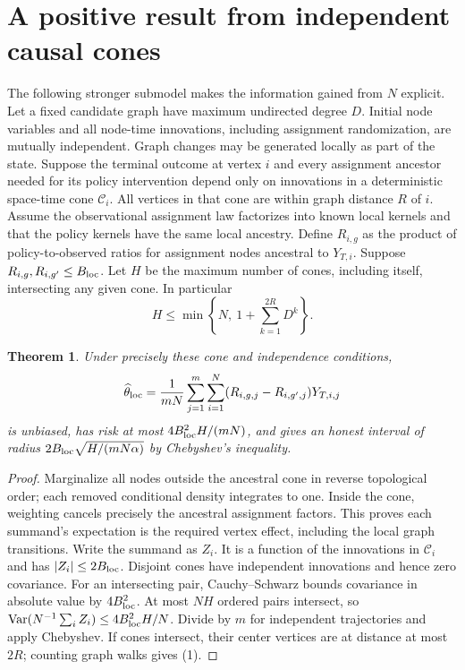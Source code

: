 \documentclass[11pt]{article}
\newtheorem{theorem}{Theorem}
\theoremstyle{definition}
\begin{document}
\section*{A positive result from independent causal cones}
The following stronger submodel makes the information gained from $N$
explicit. Let a fixed candidate graph have maximum undirected degree $D$.
Initial node variables and all node-time innovations, including assignment
randomization, are mutually independent. Graph changes may be generated
locally as part of the state. Suppose the terminal outcome at vertex $i$
and every assignment ancestor needed for its policy intervention depend
only on innovations in a deterministic space-time cone $\mathcal C_i$.
All vertices in that cone are within graph distance $R$ of $i$.
Assume the observational assignment law factorizes into known local
kernels and that the policy kernels have the same local ancestry.
Define $R_{i,g}$ as the product of policy-to-observed ratios for assignment
nodes ancestral to $Y_{T,i}$. Suppose $R_{i,g},R_{i,g'}\le B_{\rm loc}$.
Let $H$ be the maximum number of cones, including itself, intersecting
any given cone. In particular
\[
 H\le \min\left\{N,\ 1+\sum_{k=1}^{2R}D^k\right\}.    \tag{1}
\]
\begin{theorem}
Under precisely these cone and independence conditions,
\[
 \widehat\theta_{\rm loc}=
 \frac1{mN}\sum_{j=1}^m\sum_{i=1}^N
 (R_{i,g,j}-R_{i,g',j})Y_{T,i,j}
\]
is unbiased, has risk at most $4B_{\rm loc}^2H/(mN)$, and gives an
honest interval of radius $2B_{\rm loc}\sqrt{H/(mN\alpha)}$ by
Chebyshev's inequality.
\end{theorem}
\begin{proof}
Marginalize all nodes outside the ancestral cone in reverse topological
order; each removed conditional density integrates to one. Inside the
cone, weighting cancels precisely the ancestral assignment factors.
This proves each summand's expectation is the required vertex effect,
including the local graph transitions.
Write the summand as $Z_i$. It is a function of the innovations in
$\mathcal C_i$ and has $|Z_i|\le2B_{\rm loc}$. Disjoint cones have
independent innovations and hence zero covariance. For an intersecting
pair, Cauchy--Schwarz bounds covariance in absolute value by
$4B_{\rm loc}^2$. At most $NH$ ordered pairs intersect, so
$\operatorname{Var}(N^{-1}\sum_iZ_i)\le4B_{\rm loc}^2H/N$.
Divide by $m$ for independent trajectories and apply Chebyshev.
If cones intersect, their center vertices are at distance at most $2R$;
counting graph walks gives (1).
\end{proof}
\end{document}
